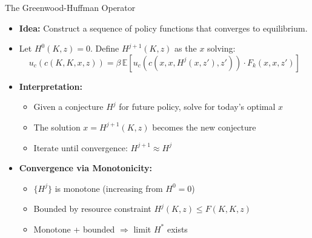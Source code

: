 \documentclass[10pt,english,aspectratio=169]{beamer}
\begin{document}
\begin{frame}{The Greenwood-Huffman Operator}
\begin{itemize}
\item \textbf{Idea:} Construct a sequence of policy functions that converges to equilibrium.

\medskip
\item Let $H^{0}(K,z) = 0$. Define $H^{j+1}(K,z)$ as the $x$ solving:
\[
u_c(c(K,K,x,z)) = \beta \, \mathbb{E} \left[ u_c(c(x,x,H^{j}(x,z'),z')) \cdot F_k(x,x,z') \right]
\]

\medskip
\item \textbf{Interpretation:}
\begin{itemize}
    \item Given a conjecture $H^j$ for future policy, solve for today's optimal $x$
    \item The solution $x = H^{j+1}(K,z)$ becomes the new conjecture
    \item Iterate until convergence: $H^{j+1} \approx H^j$
\end{itemize}

\medskip
\item \textbf{Convergence via Monotonicity:}
\begin{itemize}
    \item $\{H^j\}$ is monotone (increasing from $H^0 = 0$)
    \item Bounded by resource constraint $H^j(K,z) \leq F(K,K,z)$
    \item Monotone + bounded $\Rightarrow$ limit $H^*$ exists
\end{itemize}
\end{itemize}
\end{frame}
\end{document}
